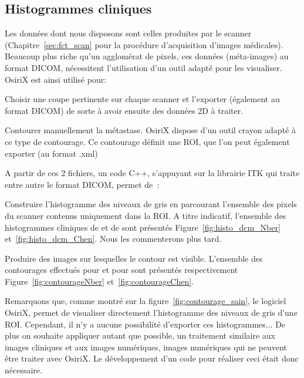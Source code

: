 \documentclass[main.tex]{subfiles}
\begin{document}
\subsection{Histogrammes cliniques}
Les données dont nous disposons sont celles produites par le scanner (\cf Chapitre~\ref{sec:fct_scan} pour la procédure d'acquisition d'images médicales). Beaucoup plus riche qu'un agglomérat de pixels, ces données (méta-images) au format DICOM, nécessitent l'utilisation d'un outil adapté pour les visualiser. OsiriX est ainsi utilisé pour:
\begin{myitemize}
\item Choisir une coupe pertinente sur chaque scanner et l'exporter (également au format DICOM) de sorte à avoir ensuite des données 2D à traiter.
\item Contourer manuellement la métastase. OsiriX dispose d'un outil crayon adapté à ce type de contourage. Ce contourage définit une ROI, que l'on peut également exporter (au format .xml)
\end{myitemize}
A partir de ces 2 fichiers, un code C++, s'appuyant sur la librairie ITK qui traite entre autre le format DICOM, permet de~:
\begin{myitemize}
\item Construire l'histogramme des niveaux de gris en parcourant  l'ensemble des pixels du scanner contenus uniquement dans la ROI. 
A titre indicatif, l'ensemble des histogrammes cliniques de \Nber et de \Chen sont présentés Figure~\ref{fig:histo_dcm_Nber} et~\ref{fig:histo_dcm_Chen}. Nous les commenterons plus tard.
\item Produire des images sur lesquelles le contour est visible. L'ensemble des contourages effectués pour \Nber et pour \Chen sont présentés respectivement Figure~\ref{fig:contourageNber} et~\ref{fig:contourageChen}.
\end{myitemize}


Remarquons que, comme montré sur la figure~\ref{fig:contourage_sain}, le logiciel OsiriX, permet de visualiser directement l'histogramme des niveaux de gris d'une ROI. Cependant, il n'y a aucune possibilité d'exporter ces histogrammes... De plus on souhaite appliquer autant que possible, un traitement similaire aux images cliniques et aux images numériques, images numériques qui ne peuvent être traiter avec OsiriX. Le développement d'un code pour réaliser ceci était donc nécessaire.
\end{document}
